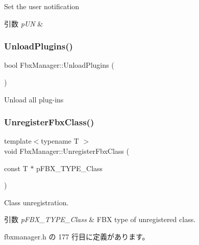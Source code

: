 Set the user notification 
\begin{DoxyParams}{引数}
{\em p\+UN} & \\
\hline
\end{DoxyParams}
\mbox{\label{class_fbx_manager_ac088e1b925b4576e9221f48533edee98}} 
\subsubsection{\texorpdfstring{Unload\+Plugins()}{UnloadPlugins()}}
{\footnotesize\ttfamily bool Fbx\+Manager\+::\+Unload\+Plugins (\begin{DoxyParamCaption}{ }\end{DoxyParamCaption})}

Unload all plug-\/ins \mbox{\label{class_fbx_manager_acaa996fbb60c38c9d015f18c91fa81be}} 
\subsubsection{\texorpdfstring{Unregister\+Fbx\+Class()}{UnregisterFbxClass()}}
{\footnotesize\ttfamily template$<$typename T $>$ \\
void Fbx\+Manager\+::\+Unregister\+Fbx\+Class (\begin{DoxyParamCaption}\item[{const T $\ast$}]{p\+F\+B\+X\+\_\+\+T\+Y\+P\+E\+\_\+\+Class }\end{DoxyParamCaption})\hspace{0.3cm}{\ttfamily [inline]}}

Class unregistration. 
\begin{DoxyParams}{引数}
{\em p\+F\+B\+X\+\_\+\+T\+Y\+P\+E\+\_\+\+Class} & F\+BX type of unregistered class. \\
\hline
\end{DoxyParams}


 fbxmanager.\+h の 177 行目に定義があります。

\mbox{\label{class_fbx_manager_a489bd5a18d410b98fcfd87be401c9347}} 
